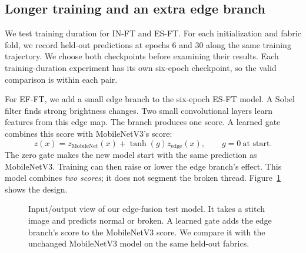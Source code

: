 \documentclass[conference,a4paper]{IEEEtran}
\begin{document}
\subsection{Longer training and an extra edge branch}
We test training duration for IN-FT and ES-FT. For each initialization and fabric fold, we record held-out predictions at epochs 6 and 30 along the same training trajectory. We choose both checkpoints before examining their results. Each training-duration experiment has its own six-epoch checkpoint, so the valid comparison is within each pair.

For EF-FT, we add a small edge branch to the six-epoch ES-FT model. A Sobel filter finds strong brightness changes. Two small convolutional layers learn features from this edge map. The branch produces one score. A learned gate combines this score with MobileNetV3's score:
\begin{equation}
 z(x)=z_{\mathrm{MobileNet}}(x)+\tanh(g)z_{\mathrm{edge}}(x),\qquad g=0\ \text{at start}.
\label{eq:fusion}
\end{equation}
The zero gate makes the new model start with the same prediction as MobileNetV3. Training can then raise or lower the edge branch's effect. This model combines \emph{two scores}; it does not segment the broken thread. Figure~\ref{fig:fusion} shows the design.

\begin{figure}[!t]\centering
{}
\caption{Input/output view of our edge-fusion test model. It takes a stitch image and predicts normal or broken. A learned gate adds the edge branch's score to the MobileNetV3 score. We compare it with the unchanged MobileNetV3 model on the same held-out fabrics.}\label{fig:fusion}
\end{figure}
\end{document}
